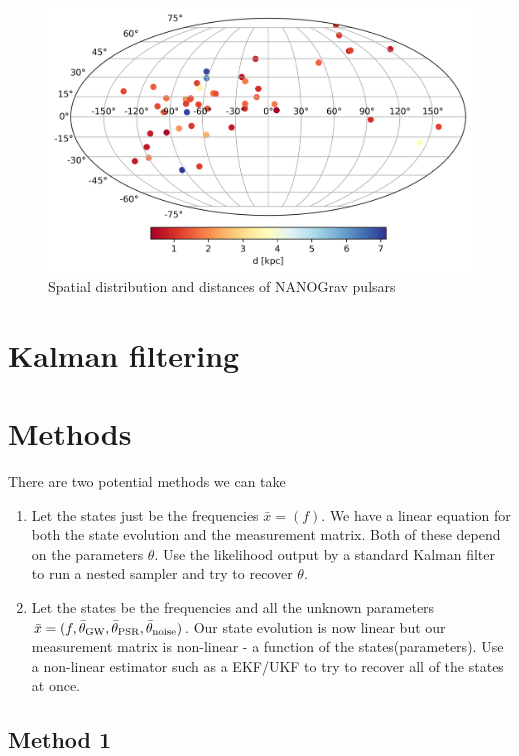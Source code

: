\documentclass[fleqn,usenatbib,useAMS]{mnras}
\begin{document}
 
 

\begin{figure}
	\includegraphics[width=0.8\columnwidth]{images/pulsars}
	\caption{Spatial distribution and distances of NANOGrav pulsars}
	\label{fig:pulsar_distrib}
\end{figure}



\section{Kalman filtering}

\section{Methods}


There are two potential methods we can take

\begin{enumerate}
	\item Let the states just be the frequencies $\bar{x} = (f)$. We have a linear equation for both the state evolution and the measurement matrix. Both of these depend on the parameters $\theta$. Use the likelihood output by a standard Kalman filter to run a nested sampler and try to recover $\theta$.
	\item Let the states be the frequencies and all the unknown parameters $\bar{x} = (f, \bar{\theta}_{\rm GW},\bar{\theta}_{\rm PSR},\bar{\theta}_{\rm noise})$. Our state evolution is now linear but our measurement matrix is non-linear - a function of the states(parameters). Use a non-linear estimator such as a EKF/UKF to try to recover all of the states at once.
\end{enumerate}


\subsection{Method 1}
\end{document}
